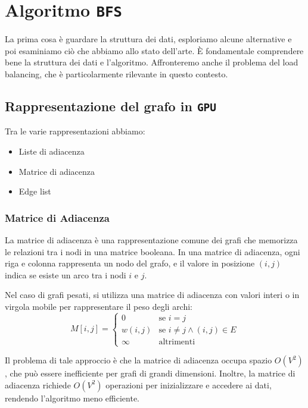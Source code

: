 \chapter{Algoritmo \texttt{BFS}}

La prima cosa è guardare la struttura dei dati, esploriamo alcune
alternative e poi esaminiamo ciò che abbiamo allo stato dell'arte.
È fondamentale comprendere bene la struttura dei dati e l'algoritmo.
Affronteremo anche il problema del load balancing, che è particolarmente
rilevante in questo contesto.

\section{Rappresentazione del grafo in \texttt{GPU}}

Tra le varie rappresentazioni abbiamo:

\begin{itemize}
  \item Liste di adiacenza
  \item Matrice di adiacenza
  \item Edge list
\end{itemize}

\subsection{Matrice di Adiacenza}

La matrice di adiacenza è una rappresentazione comune dei grafi che memorizza
le relazioni tra i nodi in una matrice booleana. In una matrice di adiacenza,
ogni riga e colonna rappresenta un nodo del grafo, e il valore in posizione
\((i, j)\) indica se esiste un arco tra i nodi \(i\) e \(j\).

Nel caso di grafi pesati, si utilizza una matrice di adiacenza con valori
interi o in virgola mobile per rappresentare il peso degli archi:
\[
  M[i,j] = 
  \begin{cases} 
    0 & \text{se } i = j \\
    w(i,j) & \text{se } i \neq j \land (i,j) \in E \\
    \infty & \text{altrimenti}
  \end{cases}
\]

Il problema di tale approccio è che la matrice di adiacenza occupa spazio
\(O(V^2)\), che può essere inefficiente per grafi di grandi dimensioni.
Inoltre, la matrice di adiacenza richiede \(O(V^2)\) operazioni per
inizializzare e accedere ai dati, rendendo l'algoritmo meno efficiente.

